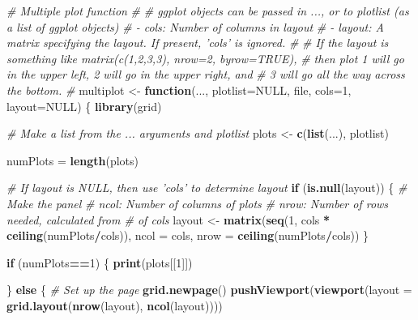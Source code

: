 \documentclass[]{book}
\newenvironment{Shaded}{\begin{snugshade}}{\end{snugshade}}
\newcommand{\KeywordTok}[1]{\textcolor[rgb]{0.13,0.29,0.53}{\textbf{#1}}}
\newcommand{\DataTypeTok}[1]{\textcolor[rgb]{0.13,0.29,0.53}{#1}}
\newcommand{\DecValTok}[1]{\textcolor[rgb]{0.00,0.00,0.81}{#1}}
\newcommand{\StringTok}[1]{\textcolor[rgb]{0.31,0.60,0.02}{#1}}
\newcommand{\CommentTok}[1]{\textcolor[rgb]{0.56,0.35,0.01}{\textit{#1}}}
\newcommand{\OtherTok}[1]{\textcolor[rgb]{0.56,0.35,0.01}{#1}}
\newcommand{\ControlFlowTok}[1]{\textcolor[rgb]{0.13,0.29,0.53}{\textbf{#1}}}
\newcommand{\OperatorTok}[1]{\textcolor[rgb]{0.81,0.36,0.00}{\textbf{#1}}}
\newcommand{\NormalTok}[1]{#1}
\theoremstyle{definition}
\theoremstyle{definition}
\theoremstyle{definition}
\theoremstyle{remark}
\begin{document}
\begin{Shaded}
\begin{Highlighting}[]
\CommentTok{# Multiple plot function}
\CommentTok{#}
\CommentTok{# ggplot objects can be passed in ..., or to plotlist (as a list of ggplot objects)}
\CommentTok{# - cols:   Number of columns in layout}
\CommentTok{# - layout: A matrix specifying the layout. If present, 'cols' is ignored.}
\CommentTok{#}
\CommentTok{# If the layout is something like matrix(c(1,2,3,3), nrow=2, byrow=TRUE),}
\CommentTok{# then plot 1 will go in the upper left, 2 will go in the upper right, and}
\CommentTok{# 3 will go all the way across the bottom.}
\CommentTok{#}
\NormalTok{multiplot <-}\StringTok{ }\ControlFlowTok{function}\NormalTok{(..., }\DataTypeTok{plotlist=}\OtherTok{NULL}\NormalTok{, file, }\DataTypeTok{cols=}\DecValTok{1}\NormalTok{, }\DataTypeTok{layout=}\OtherTok{NULL}\NormalTok{) \{}
  \KeywordTok{library}\NormalTok{(grid)}

  \CommentTok{# Make a list from the ... arguments and plotlist}
\NormalTok{  plots <-}\StringTok{ }\KeywordTok{c}\NormalTok{(}\KeywordTok{list}\NormalTok{(...), plotlist)}

\NormalTok{  numPlots =}\StringTok{ }\KeywordTok{length}\NormalTok{(plots)}

  \CommentTok{# If layout is NULL, then use 'cols' to determine layout}
  \ControlFlowTok{if}\NormalTok{ (}\KeywordTok{is.null}\NormalTok{(layout)) \{}
    \CommentTok{# Make the panel}
    \CommentTok{# ncol: Number of columns of plots}
    \CommentTok{# nrow: Number of rows needed, calculated from # of cols}
\NormalTok{    layout <-}\StringTok{ }\KeywordTok{matrix}\NormalTok{(}\KeywordTok{seq}\NormalTok{(}\DecValTok{1}\NormalTok{, cols }\OperatorTok{*}\StringTok{ }\KeywordTok{ceiling}\NormalTok{(numPlots}\OperatorTok{/}\NormalTok{cols)),}
                    \DataTypeTok{ncol =}\NormalTok{ cols, }\DataTypeTok{nrow =} \KeywordTok{ceiling}\NormalTok{(numPlots}\OperatorTok{/}\NormalTok{cols))}
\NormalTok{  \}}

 \ControlFlowTok{if}\NormalTok{ (numPlots}\OperatorTok{==}\DecValTok{1}\NormalTok{) \{}
    \KeywordTok{print}\NormalTok{(plots[[}\DecValTok{1}\NormalTok{]])}

\NormalTok{  \} }\ControlFlowTok{else}\NormalTok{ \{}
    \CommentTok{# Set up the page}
    \KeywordTok{grid.newpage}\NormalTok{()}
    \KeywordTok{pushViewport}\NormalTok{(}\KeywordTok{viewport}\NormalTok{(}\DataTypeTok{layout =} \KeywordTok{grid.layout}\NormalTok{(}\KeywordTok{nrow}\NormalTok{(layout), }\KeywordTok{ncol}\NormalTok{(layout))))}


\end{Highlighting}
\end{Shaded}
\end{document}
